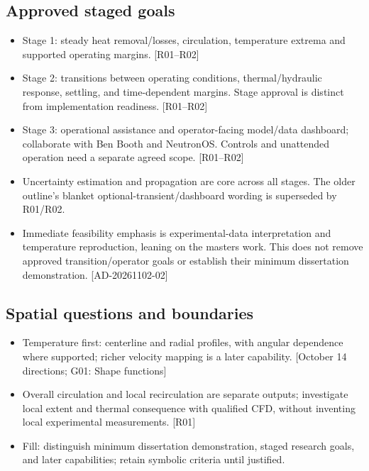 \subsection{Approved staged goals}
\begin{itemize}[leftmargin=*]
\item Stage 1: steady heat removal/losses, circulation, temperature extrema and supported operating margins. [R01--R02]
\item Stage 2: transitions between operating conditions, thermal/hydraulic response, settling, and time-dependent margins. Stage approval is distinct from implementation readiness. [R01--R02]
\item Stage 3: operational assistance and operator-facing model/data dashboard; collaborate with Ben Booth and NeutronOS. Controls and unattended operation need a separate agreed scope. [R01--R02]
\item Uncertainty estimation and propagation are core across all stages. The older outline's blanket optional-transient/dashboard wording is superseded by R01/R02.
\item Immediate feasibility emphasis is experimental-data interpretation and temperature reproduction, leaning on the master\textquotesingle{}s work. This does not remove approved transition/operator goals or establish their minimum dissertation demonstration. [AD-20261102-02]
\end{itemize}

\subsection{Spatial questions and boundaries}
\begin{itemize}[leftmargin=*]
\item Temperature first: centerline and radial profiles, with angular dependence where supported; richer velocity mapping is a later capability. [October 14 directions; G01: Shape functions]
\item Overall circulation and local recirculation are separate outputs; investigate local extent and thermal consequence with qualified CFD, without inventing local experimental measurements. [R01]
\item Fill: distinguish minimum dissertation demonstration, staged research goals, and later capabilities; retain symbolic criteria until justified.
\end{itemize}
